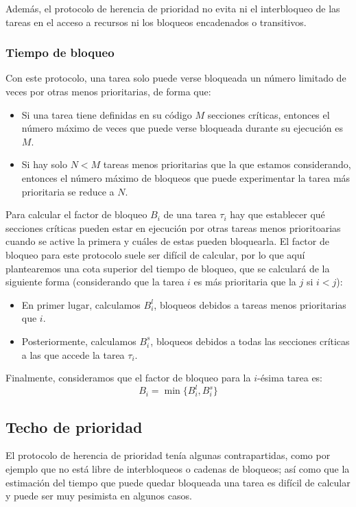 Además, el protocolo de herencia de prioridad no evita ni el interbloqueo de las tareas en el acceso a recursos ni los bloqueos encadenados o transitivos.

\subsubsection{Tiempo de bloqueo}
Con este protocolo, una tarea solo puede verse bloqueada un número limitado de veces por otras menos prioritarias, de forma que:
\begin{itemize}
    \item Si una tarea tiene definidas en su código $M$ secciones críticas, entonces el número máximo de veces que puede verse bloqueada durante su ejecución es $M$.
    \item Si hay solo $N<M$ tareas menos prioritarias que la que estamos considerando, entonces el número máximo de bloqueos que puede experimentar la tarea más prioritaria se reduce a $N$.
\end{itemize}
Para calcular el factor de bloqueo $B_i$ de una tarea $\tau_i$ hay que establecer qué secciones críticas pueden estar en ejecución por otras tareas menos prioritoarias cuando se active la primera y cuáles de estas pueden bloquearla. El factor de bloqueo para este protocolo suele ser difícil de calcular, por lo que aquí plantearemos una cota superior del tiempo de bloqueo, que se calculará de la siguiente forma (considerando que la tarea $i$ es más prioritaria que la $j$ si $i<j$):
\begin{itemize}
    \item En primer lugar, calculamos $B_i^l$, bloqueos debidos a tareas menos prioritarias que $i$.
    \item Posteriormente, calculamos $B_i^s$, bloqueos debidos a todas las secciones críticas a las que accede la tarea $\tau_i$.
\end{itemize}
Finalmente, consideramos que el factor de bloqueo para la $i$-ésima tarea es:
\begin{equation*}
    B_i = \min\{B_i^l, B_i^s\}
\end{equation*}

\subsection{Techo de prioridad}
El protocolo de herencia de prioridad tenía algunas contrapartidas, como por ejemplo que no está libre de interbloqueos o cadenas de bloqueos; así como que la estimación del tiempo que puede quedar bloqueada una tarea es difícil de calcular y puede ser muy pesimista en algunos casos.\\

